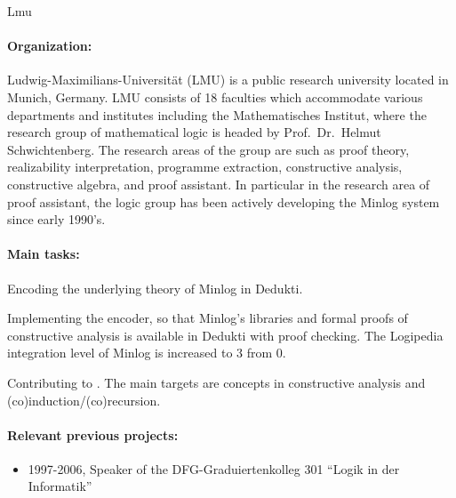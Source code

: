 \begin{sitedescription}{Lmu}

\newcommand{\inquotes}[1]{``#1''}
\paragraph{Organization:}

Ludwig-Maximilians-Universit\"at (LMU) is a public research university
located in Munich, Germany.  LMU consists of 18 faculties which
accommodate various departments and institutes including the
Mathematisches Institut, where the research group of mathematical
logic is headed by Prof.\ Dr.\ Helmut Schwichtenberg.  The research
areas of the group are such as proof theory, realizability
interpretation, programme extraction, constructive analysis,
constructive algebra, and proof assistant.  In particular in the
research area of proof assistant, the logic group has been actively
developing the Minlog system since early 1990's.

\paragraph{Main tasks:}

\begin{compactitem}
  \item Encoding the underlying theory of Minlog in Dedukti.  
  \item Implementing the encoder, so that Minlog's libraries and formal proofs of constructive analysis is available in Dedukti with proof checking.
The Logipedia integration level of Minlog is increased to 3 from 0.  
  \item Contributing to .  The main targets are concepts in constructive analysis and (co)induction/(co)recursion.

\end{compactitem}

\paragraph{Relevant previous projects:}

\begin{itemize}
  \item 1997-2006, Speaker of the DFG-Graduiertenkolleg 301
    \inquotes{Logik in der Informatik}


\end{itemize}
\end{sitedescription}

